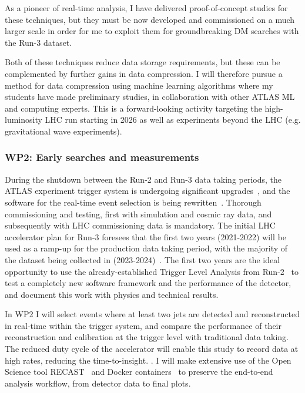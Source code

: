 \documentclass[11pt,a4paper]{article}
\begin{document}
As a pioneer of real-time analysis, I have delivered proof-of-concept studies for these techniques, but they must be now developed and commissioned on a much larger scale in order for me to exploit them for groundbreaking DM searches with the Run-3 dataset. 


Both of these techniques reduce data storage requirements, but these can be complemented by further gains in data compression. I will therefore pursue a method for data compression using machine learning algorithms where my students have made preliminary studies, in collaboration with other ATLAS ML and computing experts. This is a forward-looking activity targeting the high-luminosity LHC run starting in 2026 as well as experiments beyond the LHC (e.g. gravitational wave experiments).

\subsubsection*{WP2: Early searches and measurements}

During the shutdown between the Run-2 and Run-3 data taking periods, the ATLAS experiment trigger system is undergoing significant upgrades~\cite{FEXes}, and the software for the real-time event selection is being rewritten~\cite{MT}. 
Thorough commissioning and testing, first with simulation and cosmic ray data, and subsequently with LHC commissioning data is mandatory. The initial LHC accelerator plan for Run-3  foresees that the first two years (2021-2022) will be used as a ramp-up for the production data taking period, with the majority of the dataset being collected in (2023-2024)~\cite{SomeRandomEuropeanStrategyPresentationOrTooMuch?}. 
The first two years are the ideal opportunity to use the already-established Trigger Level Analysis from Run-2~\cite{TLAPRL} to test a completely new software framework and the performance of the detector, and document this work with physics and technical results. 

In WP2 I will select events where at least two jets are detected and reconstructed in real-time within the trigger system, and compare the performance of their reconstruction and calibration at the trigger level with traditional data taking. The reduced duty cycle of the accelerator will enable this study to record data at high rates, reducing the time-to-insight. \textbf{}.
I will make extensive use of the Open Science tool RECAST~\cite{RECAST} and Docker containers~\cite{Docker} to preserve the end-to-end analysis workflow, from detector data to final plots.  
\end{document}
